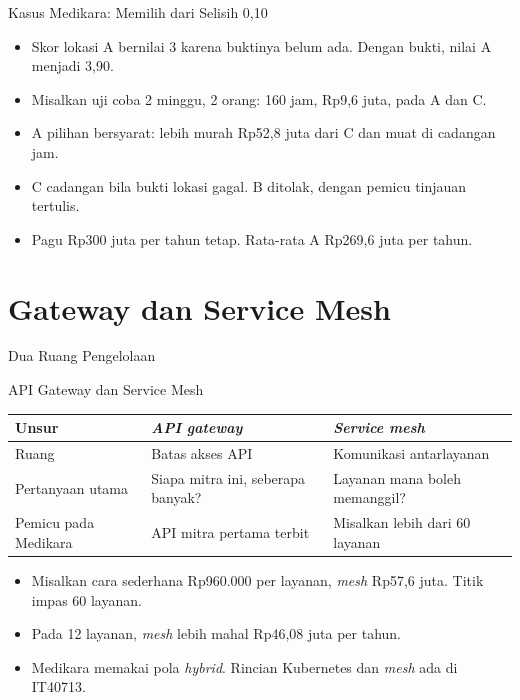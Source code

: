 \documentclass[aspectratio=169, table, 12pt]{beamer}
\begin{document}
\begin{frame}{{\Large Kasus Medikara: Memilih dari Selisih 0,10}}
  \vspace{8pt}
  \begin{itemize}
    \item Skor lokasi A bernilai 3 karena buktinya belum ada. Dengan bukti, nilai A menjadi 3,90.
    \item Misalkan uji coba 2 minggu, 2 orang: 160 jam, Rp9,6 juta, pada A dan C.
    \item A pilihan bersyarat: lebih murah Rp52,8 juta dari C dan muat di cadangan jam.
    \item C cadangan bila bukti lokasi gagal. B ditolak, dengan pemicu tinjauan tertulis.
    \item Pagu Rp300 juta per tahun tetap. Rata-rata A Rp269,6 juta per tahun.
  \end{itemize}
\end{frame}

\section{Gateway dan Service Mesh}

\begin{frame}{{\Large Dua Ruang Pengelolaan}}
  \centering
\end{frame}

\begin{frame}{{\Large API Gateway dan Service Mesh}}
  \footnotesize
  \begin{tabularx}{\textwidth}{>{\raggedright\arraybackslash}p{2.6cm} >{\raggedright\arraybackslash}X >{\raggedright\arraybackslash}X}
    \hline
    \textbf{Unsur} & \textbf{\textit{API gateway}} & \textbf{\textit{Service mesh}} \\ \hline
    Ruang & Batas akses API & Komunikasi antarlayanan \\ \hline
    Pertanyaan utama & Siapa mitra ini, seberapa banyak? & Layanan mana boleh memanggil? \\ \hline
    Pemicu pada Medikara & API mitra pertama terbit & Misalkan lebih dari 60 layanan \\ \hline
  \end{tabularx}

  \vspace{8pt}
  \small
  \begin{itemize}
    \item Misalkan cara sederhana Rp960.000 per layanan, \textit{mesh} Rp57,6 juta. Titik impas 60 layanan.
    \item Pada 12 layanan, \textit{mesh} lebih mahal Rp46,08 juta per tahun.
    \item Medikara memakai pola \textit{hybrid}. Rincian Kubernetes dan \textit{mesh} ada di IT40713.
  \end{itemize}
\end{frame}
\end{document}
